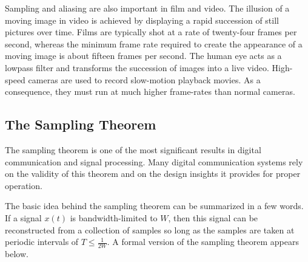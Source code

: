 Sampling and aliasing are also important in film and video.
The illusion of a moving image in video is achieved by displaying a rapid succession of still pictures over time.
Films are typically shot at a rate of twenty-four frames per second, whereas the minimum frame rate required to create the appearance of a moving image is about fifteen frames per second.
The human eye acts as a lowpass filter and transforms the succession of images into a live video.
High-speed cameras are used to record slow-motion playback movies.
As a consequence, they must run at much higher frame-rates than normal cameras.

\subsection{The Sampling Theorem}

The sampling theorem is one of the most significant results in digital communication and signal processing.
Many digital communication systems rely on the validity of this theorem and on the design insights it provides for proper operation.

The basic idea behind the sampling theorem can be summarized in a few words.
If a signal $x(t)$ is bandwidth-limited to $W$, then this signal can be reconstructed from a collection of samples so long as the samples are taken at periodic intervals of $T \leq \frac{1}{2W}$.
A formal version of the sampling theorem appears below.

